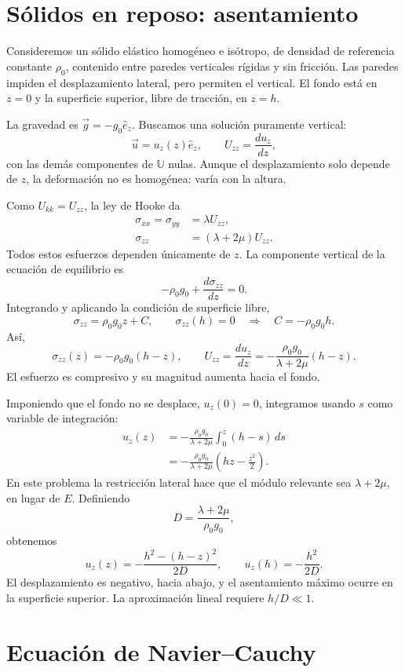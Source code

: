 \section{Sólidos en reposo: asentamiento}

Consideremos un sólido elástico homogéneo e isótropo, de densidad de referencia constante $\rho_0$, contenido entre paredes verticales rígidas y sin fricción. Las paredes impiden el desplazamiento lateral, pero permiten el vertical. El fondo está en $z=0$ y la superficie superior, libre de tracción, en $z=h$.

La gravedad es $\vec g=-g_0\hat e_z$. Buscamos una solución puramente vertical:
\[
\vec u=u_z(z)\hat e_z,
\qquad
U_{zz}=\frac{du_z}{dz},
\]
con las demás componentes de $\mathbb U$ nulas. Aunque el desplazamiento solo depende de $z$, la deformación no es homogénea: varía con la altura.

Como $U_{kk}=U_{zz}$, la ley de Hooke da
\[
\begin{aligned}
\sigma_{xx}=\sigma_{yy}&=\lambda U_{zz},\\
\sigma_{zz}&=(\lambda+2\mu)U_{zz}.
\end{aligned}
\]
Todos estos esfuerzos dependen únicamente de $z$. La componente vertical de la ecuación de equilibrio es
\[
-\rho_0g_0+\frac{d\sigma_{zz}}{dz}=0.
\]
Integrando y aplicando la condición de superficie libre,
\[
\sigma_{zz}=\rho_0g_0z+C,
\qquad
\sigma_{zz}(h)=0
\quad\Longrightarrow\quad C=-\rho_0g_0h.
\]
Así,
\[
\boxed{\sigma_{zz}(z)=-\rho_0g_0(h-z)},
\qquad
U_{zz}=\frac{du_z}{dz}
=-\frac{\rho_0g_0}{\lambda+2\mu}(h-z).
\]
El esfuerzo es compresivo y su magnitud aumenta hacia el fondo.

Imponiendo que el fondo no se desplace, $u_z(0)=0$, integramos usando $s$ como variable de integración:
\[
\begin{aligned}
u_z(z)
&=-\frac{\rho_0g_0}{\lambda+2\mu}\int_0^z(h-s)\,ds\\
&=-\frac{\rho_0g_0}{\lambda+2\mu}
\left(hz-\frac{z^2}{2}\right).
\end{aligned}
\]
En este problema la restricción lateral hace que el módulo relevante sea $\lambda+2\mu$, en lugar de $E$. Definiendo
\[
D=\frac{\lambda+2\mu}{\rho_0g_0},
\]
obtenemos
\[
\boxed{u_z(z)=-\frac{h^2-(h-z)^2}{2D}},
\qquad u_z(h)=-\frac{h^2}{2D}.
\]
El desplazamiento es negativo, hacia abajo, y el asentamiento máximo ocurre en la superficie superior. La aproximación lineal requiere $h/D\ll1$.

\section{Ecuación de Navier--Cauchy}

